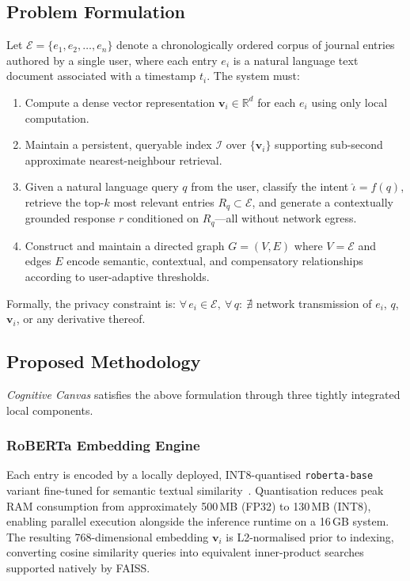 \documentclass[12pt, letterpaper]{article}
\newcommand{\CC}{\textit{Cognitive Canvas}}
\begin{document}
\subsection{Problem Formulation}

Let $\mathcal{E} = \{e_1, e_2, \ldots, e_n\}$ denote a
chronologically ordered corpus of journal entries authored by
a single user, where each entry $e_i$ is a natural language
text document associated with a timestamp $t_i$.
The system must:

\begin{enumerate}
  \item Compute a dense vector representation
    $\mathbf{v}_i \in \mathbb{R}^d$ for each $e_i$
    using only local computation.

  \item Maintain a persistent, queryable index
    $\mathcal{I}$ over $\{\mathbf{v}_i\}$ supporting
    sub-second approximate nearest-neighbour retrieval.

  \item Given a natural language query $q$ from the user,
    classify the intent $\hat{\iota} = f(q)$, retrieve the
    top-$k$ most relevant entries
    $R_q \subset \mathcal{E}$, and generate a contextually
    grounded response $r$ conditioned on $R_q$---all without
    network egress.

  \item Construct and maintain a directed graph
    $G = (V, E)$ where $V = \mathcal{E}$ and edges $E$
    encode semantic, contextual, and compensatory
    relationships according to user-adaptive thresholds.
\end{enumerate}

Formally, the privacy constraint is:
$\forall\, e_i \in \mathcal{E},\ \forall\, q:\
\nexists$ network transmission of $e_i$, $q$,
$\mathbf{v}_i$, or any derivative thereof.

\subsection{Proposed Methodology}

\CC{} satisfies the above formulation through three tightly
integrated local components.

\subsubsection{RoBERTa Embedding Engine}
Each entry is encoded by a locally deployed, INT8-quantised
\texttt{roberta-base} variant fine-tuned for semantic textual
similarity~\cite{liu2019roberta}.
Quantisation reduces peak RAM consumption from approximately
500\,MB (FP32) to 130\,MB (INT8), enabling parallel execution
alongside the inference runtime on a 16\,GB system.
The resulting 768-dimensional embedding $\mathbf{v}_i$ is
L2-normalised prior to indexing, converting cosine similarity
queries into equivalent inner-product searches supported
natively by FAISS.
\end{document}
